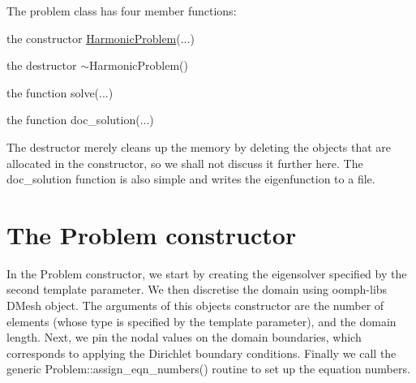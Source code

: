 The problem class has four member functions\+:
\begin{DoxyItemize}
\item the constructor {\ttfamily \hyperlink{classHarmonicProblem}{Harmonic\+Problem}}(...)
\item the destructor {\ttfamily $\sim$\+Harmonic\+Problem()} 
\item the function {\ttfamily solve}(...)
\item the function {\ttfamily doc\+\_\+solution}(...)
\end{DoxyItemize}The destructor merely cleans up the memory by deleting the objects that are allocated in the constructor, so we shall not discuss it further here. The {\ttfamily doc\+\_\+solution} function is also simple and writes the eigenfunction to a file.



 

\hypertarget{index_constructor}{}\section{The Problem constructor}\label{index_constructor}
In the {\ttfamily Problem} constructor, we start by creating the eigensolver specified by the second template parameter. We then discretise the domain using {\ttfamily oomph-\/lib\textquotesingle{}s} {\+D\+Mesh} object. The arguments of this object\textquotesingle{}s constructor are the number of elements (whose type is specified by the template parameter), and the domain length. Next, we pin the nodal values on the domain boundaries, which corresponds to applying the Dirichlet boundary conditions. Finally we call the generic {\ttfamily Problem\+::assign\+\_\+eqn\+\_\+numbers()} routine to set up the equation numbers.

